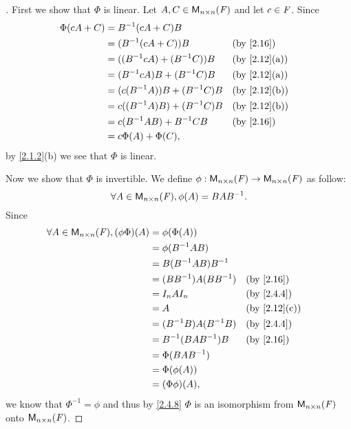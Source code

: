 \begin{proof}[]
	First we show that \(\Phi\) is linear.
	Let \(A, C \in \ms[n][n][\F]\) and let \(c \in \mathit{F}\).
	Since
	\begin{align*}
		\Phi(cA + C) & = B^{-1} (cA + C) B                                 \\
		             & = (B^{-1} (cA + C)) B             &  & \by{2.16}    \\
		             & = ((B^{-1} c A) + (B^{-1} C)) B   &  & \by{2.12}[a] \\
		             & = (B^{-1} c A) B + (B^{-1} C) B   &  & \by{2.12}[a] \\
		             & = (c (B^{-1} A)) B + (B^{-1} C) B &  & \by{2.12}[b] \\
		             & = c ((B^{-1} A) B) + (B^{-1} C) B &  & \by{2.12}[b] \\
		             & = c (B^{-1} A B) + B^{-1} CB      &  & \by{2.16}    \\
		             & = c \Phi(A) + \Phi(C),
	\end{align*}
	by \cref{2.1.2}(b) we see that \(\Phi\) is linear.

	Now we show that \(\Phi\) is invertible.
	We define \(\phi : \ms[n][n][\F] \to \ms[n][n][\F]\) as follow:
	\[
		\forall A \in \ms[n][n][\F], \phi(A) = BAB^{-1}.
	\]
	Since
	\begin{align*}
		\forall A \in \ms[n][n][\F], (\phi \Phi)(A) & = \phi(\Phi(A))                             \\
		                                            & = \phi(B^{-1} AB)                           \\
		                                            & = B(B^{-1} AB) B^{-1}                       \\
		                                            & = (BB^{-1}) A (BB^{-1})   &  & \by{2.16}    \\
		                                            & = I_n A I_n               &  & \by{2.4.4}   \\
		                                            & = A                       &  & \by{2.12}[c] \\
		                                            & = (B^{-1} B) A (B^{-1} B) &  & \by{2.4.4}   \\
		                                            & = B^{-1} (BAB^{-1}) B     &  & \by{2.16}    \\
		                                            & = \Phi(BAB^{-1})                            \\
		                                            & = \Phi(\phi(A))                             \\
		                                            & = (\Phi \phi)(A),
	\end{align*}
	we know that \(\Phi^{-1} = \phi\) and thus by \cref{2.4.8} \(\Phi\) is an isomorphism from \(\ms[n][n][\F]\) onto \(\ms[n][n][\F]\).
\end{proof}

